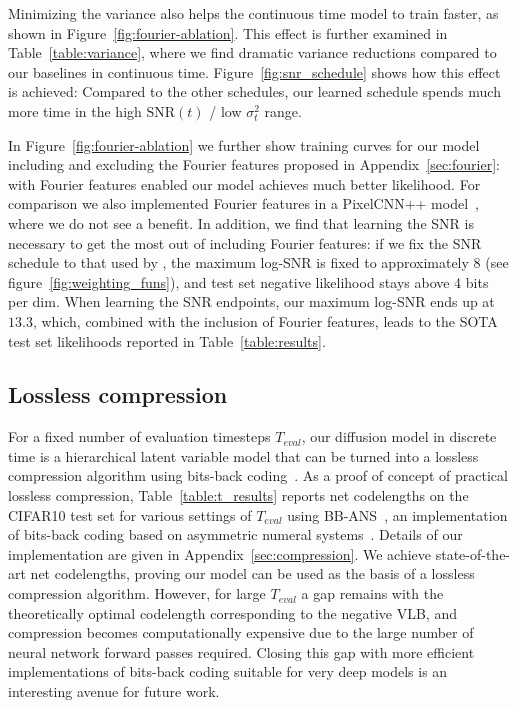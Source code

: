 \documentclass{article}
\newcommand{\snr}{\text{SNR}}
\begin{document}
Minimizing the variance also helps the continuous time model to train faster, as shown in Figure~\ref{fig:fourier-ablation}. This effect is further examined in Table~\ref{table:variance}, where we find dramatic variance reductions compared to our baselines in continuous time. Figure~\ref{fig:snr_schedule} shows how this effect is achieved: Compared to the other schedules, our learned schedule spends much more time in the high $\snr(t)$ / low $\sigma^{2}_{t}$ range.


%
%
%
%
%
%
%
%
%
%
%
%
%
%
%
%
%
%
%
%
%
%
%
%
%
%
%
%
%
%
%
%
%
%
%
%
%
%
%
%
%
%

In Figure~\ref{fig:fourier-ablation} we further show training curves for our model including and excluding the Fourier features proposed in Appendix~\ref{sec:fourier}: with Fourier features enabled our model achieves much better likelihood. For comparison we also implemented Fourier features in a PixelCNN++ model~\citep{salimans2017pixelcnn++}, where we do not see a benefit. In addition, we find that learning the SNR is necessary to get the most out of including Fourier features: if we fix the SNR schedule to that used by \cite{ho2020denoising}, the maximum log-SNR is fixed to approximately 8 (see figure~\ref{fig:weighting_funs}), and test set negative likelihood stays above 4 bits per dim. When learning the SNR endpoints, our maximum log-SNR ends up at $13.3$, which, combined with the inclusion of Fourier features, leads to the SOTA test set likelihoods reported in Table~\ref{table:results}.

\subsection{Lossless compression}
For a fixed number of evaluation timesteps $T_{eval}$, our diffusion model in discrete time is a hierarchical latent variable model that can be turned into a lossless compression algorithm using bits-back coding~\citep{hinton1993keeping}. 
As a proof of concept of practical lossless compression, Table~\ref{table:t_results} reports net codelengths on the CIFAR10 test set for various settings of $T_{eval}$ using BB-ANS~\citep{townsend2018practical}, an implementation of bits-back coding based on asymmetric numeral systems~\citep{duda2009asymmetric}. Details of our implementation are given in Appendix~\ref{sec:compression}. We achieve state-of-the-art net codelengths, proving our model can be used as the basis of a lossless compression algorithm. However, for large $T_{eval}$ a gap remains with the theoretically optimal codelength corresponding to the negative VLB, and compression becomes computationally expensive due to the large number of neural network forward passes required. Closing this gap with more efficient implementations of bits-back coding suitable for very deep models is an interesting avenue for future work.
\end{document}
